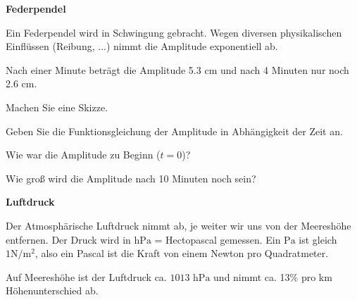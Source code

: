 

\bbwActAufgabenNr{} \textbf{Federpendel}

Ein Federpendel wird in Schwingung gebracht. Wegen diversen
physikalischen Einflüssen (Reibung, ...) nimmt die Amplitude
exponentiell ab.

Nach einer Minute beträgt die Amplitude 5.3 cm und nach 4 Minuten nur noch
2.6 cm.

\begin{bbwAufgabenBlock}

\item Machen Sie eine Skizze.
\item Geben Sie die Funktionsgleichung der Amplitude in Abhängigkeit
der Zeit an.
      
\item Wie war die Amplitude zu Beginn ($t=0$)?

\item Wie groß wird die Amplitude nach 10 Minuten noch sein?
\end{bbwAufgabenBlock}
\platzFuerBerechnungenBisEndeSeite{}



\bbwActAufgabenNr{} \textbf{Luftdruck}

Der Atmosphärische Luftdruck nimmt ab, je weiter wir uns von der
Meereshöhe entfernen. Der Druck wird in $\textrm{hPa}$ = Hectopascal
gemessen. Ein $\textrm{Pa}$ ist gleich $1 \textrm{N}/\textrm{m}^2$, also ein
Pascal ist die Kraft von einem Newton pro Quadratmeter.

Auf Meereshöhe ist der Luftdruck ca. $ 1013 \textrm{ hPa}$ und nimmt
ca. 13\% pro km Höhenunterschied ab.

